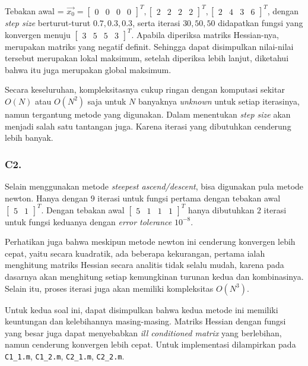 \documentclass[11pt, a4paper, onecolumn, oneside, final]{report}
\begin{document}
Tebakan awal = $\vec{x_0} = \begin{bmatrix} 0 & 0 & 0 & 0 \end{bmatrix}^{T}, \begin{bmatrix} 2 & 2 & 2 & 2 \end{bmatrix}^{T}, \begin{bmatrix} 2 & 4 & 3 & 6 \end{bmatrix}^{T}$, dengan \textit{step size} berturut-turut $0.7, 0.3, 0.3$, serta iterasi $30, 50, 50$ didapatkan fungsi yang konvergen menuju $\begin{bmatrix} 3 & 5 & 5 & 3 \end{bmatrix}^{T}$. Apabila diperiksa matriks Hessian-nya, merupakan matriks yang negatif definit. Sehingga dapat disimpulkan nilai-nilai tersebut merupakan lokal maksimum, setelah diperiksa lebih lanjut, diketahui bahwa itu juga merupakan global maksimum.

Secara keseluruhan, kompleksitasnya cukup ringan dengan komputasi sekitar $O(N)$ atau $O(N^2)$ saja untuk $N$ banyaknya \textit{unknown} untuk setiap iterasinya, namun tergantung metode yang digunakan. Dalam menentukan \textit{step size} akan menjadi salah satu tantangan juga. Karena iterasi yang dibutuhkan cenderung lebih banyak. 

\subsubsection*{C2.}

Selain menggunakan metode \textit{steepest ascend/descent}, bisa digunakan pula metode newton. Hanya dengan $9$ iterasi untuk fungsi pertama dengan tebakan awal $\begin{bmatrix} 5 & 1 \end{bmatrix}^{T}$. Dengan tebakan awal $\begin{bmatrix} 5 & 1 & 1 & 1 \end{bmatrix}^{T}$ hanya dibutuhkan $2$ iterasi untuk fungsi keduanya dengan \textit{error tolerance} $10^{-8}$.

Perhatikan juga bahwa meskipun metode newton ini cenderung konvergen lebih cepat, yaitu secara kuadratik, ada beberapa kekurangan, pertama ialah menghitung matriks Hessian secara analitis tidak selalu mudah, karena pada dasarnya akan menghitung setiap kemungkinan turunan kedua dan kombinasinya. Selain itu, proses iterasi juga akan memiliki kompleksitas $O(N^3)$.

Untuk kedua soal ini, dapat disimpulkan bahwa kedua metode ini memiliki keuntungan dan kelebihannya masing-masing. Matriks Hessian dengan fungsi yang besar juga dapat menyebabkan \textit{ill conditioned matrix} yang berlebihan, namun cenderung konvergen lebih cepat. Untuk implementasi dilampirkan pada \texttt{C1\_1.m}, \texttt{C1\_2.m}, \texttt{C2\_1.m}, \texttt{C2\_2.m}.
\end{document}
